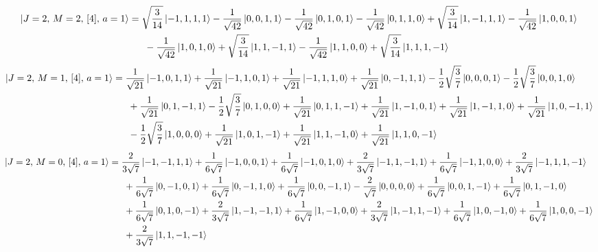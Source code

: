 \documentclass{article}
\begin{document}
{\small
\begin{equation*}
\begin{aligned}
\ket{J=2,\,M=2,\,[4],\,a=1} = \; &\sqrt{\frac{3}{14}} \ket{-1,1,1,1} - \frac{1}{\sqrt{42}} \ket{0,0,1,1} - \frac{1}{\sqrt{42}} \ket{0,1,0,1} - \frac{1}{\sqrt{42}} \ket{0,1,1,0} + \sqrt{\frac{3}{14}} \ket{1,-1,1,1} - \frac{1}{\sqrt{42}} \ket{1,0,0,1} \\
  & \; - \frac{1}{\sqrt{42}} \ket{1,0,1,0} + \sqrt{\frac{3}{14}} \ket{1,1,-1,1} - \frac{1}{\sqrt{42}} \ket{1,1,0,0} + \sqrt{\frac{3}{14}} \ket{1,1,1,-1}
\end{aligned}
\end{equation*}}
{\small
\begin{equation*}
\begin{aligned}
\ket{J=2,\,M=1,\,[4],\,a=1} = \; &\frac{1}{\sqrt{21}} \ket{-1,0,1,1} + \frac{1}{\sqrt{21}} \ket{-1,1,0,1} + \frac{1}{\sqrt{21}} \ket{-1,1,1,0} + \frac{1}{\sqrt{21}} \ket{0,-1,1,1} - \frac{1}{2}\sqrt{\frac{3}{7}} \ket{0,0,0,1} - \frac{1}{2}\sqrt{\frac{3}{7}} \ket{0,0,1,0} \\
  & \; + \frac{1}{\sqrt{21}} \ket{0,1,-1,1} - \frac{1}{2}\sqrt{\frac{3}{7}} \ket{0,1,0,0} + \frac{1}{\sqrt{21}} \ket{0,1,1,-1} + \frac{1}{\sqrt{21}} \ket{1,-1,0,1} + \frac{1}{\sqrt{21}} \ket{1,-1,1,0} + \frac{1}{\sqrt{21}} \ket{1,0,-1,1} \\
  & \; - \frac{1}{2}\sqrt{\frac{3}{7}} \ket{1,0,0,0} + \frac{1}{\sqrt{21}} \ket{1,0,1,-1} + \frac{1}{\sqrt{21}} \ket{1,1,-1,0} + \frac{1}{\sqrt{21}} \ket{1,1,0,-1}
\end{aligned}
\end{equation*}}
{\small
\begin{equation*}
\begin{aligned}
\ket{J=2,\,M=0,\,[4],\,a=1} = \; &\frac{2}{3\sqrt{7}} \ket{-1,-1,1,1} + \frac{1}{6\sqrt{7}} \ket{-1,0,0,1} + \frac{1}{6\sqrt{7}} \ket{-1,0,1,0} + \frac{2}{3\sqrt{7}} \ket{-1,1,-1,1} + \frac{1}{6\sqrt{7}} \ket{-1,1,0,0} + \frac{2}{3\sqrt{7}} \ket{-1,1,1,-1} \\
  & \; + \frac{1}{6\sqrt{7}} \ket{0,-1,0,1} + \frac{1}{6\sqrt{7}} \ket{0,-1,1,0} + \frac{1}{6\sqrt{7}} \ket{0,0,-1,1} - \frac{2}{\sqrt{7}} \ket{0,0,0,0} + \frac{1}{6\sqrt{7}} \ket{0,0,1,-1} + \frac{1}{6\sqrt{7}} \ket{0,1,-1,0} \\
  & \; + \frac{1}{6\sqrt{7}} \ket{0,1,0,-1} + \frac{2}{3\sqrt{7}} \ket{1,-1,-1,1} + \frac{1}{6\sqrt{7}} \ket{1,-1,0,0} + \frac{2}{3\sqrt{7}} \ket{1,-1,1,-1} + \frac{1}{6\sqrt{7}} \ket{1,0,-1,0} + \frac{1}{6\sqrt{7}} \ket{1,0,0,-1} \\
  & \; + \frac{2}{3\sqrt{7}} \ket{1,1,-1,-1}
\end{aligned}
\end{equation*}}
\end{document}
